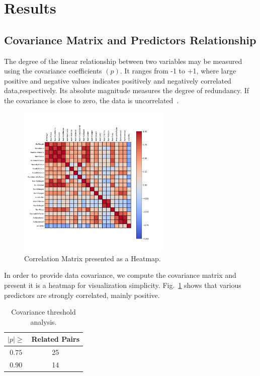 \clearpage

\section{Results}

\subsection{Covariance Matrix and Predictors Relationship}
The degree of the linear relationship between two variables may be measured using the covariance coefficients $(p)$. It ranges from -1 to +1, where large positive and negative values indicates positively and negatively correlated data,respectively. Its absolute magnitude measures the degree of redundancy. If the covariance is close to zero, the data is uncorrelated~\cite{Kuhn2013}.

\begin{figure}[htbp!]
  \centerline{\includegraphics[width=0.65\textwidth]{../../code/hw2/figures/1-correlation_matrix.pdf}}
  \caption{Correlation Matrix presented as a Heatmap.}
  \label{fig:1-correlation_matrix}
\end{figure}

In order to provide data covariance, we compute the covariance matrix and present it is a heatmap for visualization simplicity. Fig.~\ref{fig:1-correlation_matrix} shows that various predictors are strongly correlated, mainly positive.

\begin{table}[htbp]
  \caption{Covariance threshold analysis.}
  \begin{center}
  \begin{tabular}{|c|c|}
          \hline 
          $|p| \geq$ & Related Pairs\\
          \hline
          $0.75$ & 25\\
          \hline
          $0.90$ & 14 \\
          \hline
  \end{tabular}
  \label{tab:Covariance}
  \end{center}
  \end{table}

